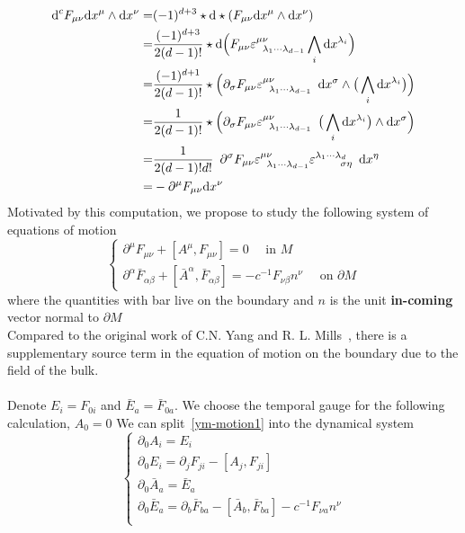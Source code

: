 \begin{equation*}
\begin{split}
\dd^c F_{\mu\nu} \dd x^\mu \wedge \dd x^\nu = & (-1)^{d+3} \star \dd \star (F_{\mu\nu} \dd x^\mu \wedge \dd x^\nu ) \\
%
= & \frac{(-1)^{d+3}}{2 (d-1)!} \star \dd \Big( F_{\mu\nu} \varepsilon^{\mu\nu}_{\enskip \lambda_1\cdots \lambda_{d-1}} \bigwedge_{i} \dd x^{\lambda_i} \Big) \\
%
= & \frac{(-1)^{d+1}}{2 (d-1)!} \star \Big( \partial_\sigma F_{\mu\nu} \varepsilon^{\mu\nu}_{\enskip \lambda_1\cdots \lambda_{d-1}} \enskip \dd x^\sigma\wedge \big(\bigwedge_{i} \dd x^{\lambda_i} \big)  \Big) \\
%
= & \frac{1}{2(d-1)!} \star \Big( \partial_\sigma F_{\mu\nu} \varepsilon^{\mu\nu}_{\enskip \lambda_1\cdots \lambda_{d-1}} \enskip \big(\bigwedge_{i} \dd x^{\lambda_i} \big) \wedge \dd x^\sigma \Big) \\
%
= & \frac{1}{2(d-1)!d !} \enskip  \partial^\sigma F_{\mu\nu} \varepsilon^{\mu\nu}_{\enskip \lambda_1\cdots \lambda_{d-1}} \varepsilon^{\lambda_1 \cdots\lambda_d}_{\enskip\enskip\enskip\enskip \sigma\eta} \enskip \dd x^\eta \\
%
= & - \partial^\mu F_{\mu\nu} \dd x^\nu
\end{split}
\end{equation*}
Motivated by this computation, we propose to study the following system of equations of motion
\begin{equation}\label{ym-motion1}
\begin{cases}
\partial^\mu F_{\mu\nu} +  [A^\mu, F_{\mu\nu}] = 0 \quad\textrm{ in $M$}\\
%
\partial^\alpha \bar F_{\alpha\beta} +  [\bar A^\alpha, \bar F_{\alpha\beta}] = 
 - c^{-1} F_{\nu\beta}n^\nu
\quad\textrm{ on $\partial M$}
\end{cases}
\end{equation}
where the quantities with bar live on the boundary and $n$ is the unit \textbf{in-coming} vector normal to $\partial M$\\
Compared to the original work of C.N. Yang and R. L. Mills~\cite{Yang1954}, there is a supplementary source term in the equation of motion on the boundary due to the field of the bulk.\\\\
Denote $E_i = F_{0i}$ and $\bar E_a = \bar F_{0a} $. 
We choose the temporal gauge for the following calculation, \ie $A_0 = 0$
We can split~\cref{ym-motion1} into the dynamical system 
\begin{equation}\label{ym-dyn}
\begin{cases}
\partial_0 A_i = E_i \\
\partial_0 E_i =  \partial_j F_{ji} - [A_j, F_{ji}] \\
\partial_0 \bar A_a = \bar E_a \\
\partial_0 \bar E_a =  \partial_b \bar F_{ba} -  [\bar A_b, \bar F_{ba}] - c^{-1} F_{\nu a} n^\nu \\
\end{cases}
\end{equation}
